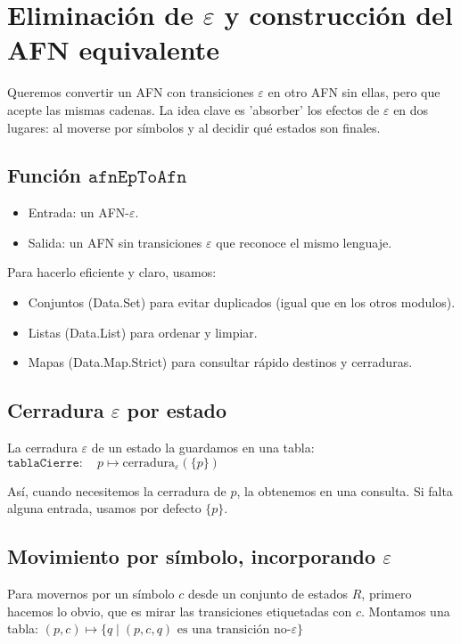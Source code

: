 
\section{Eliminación de $\varepsilon$ y construcción del AFN equivalente}

Queremos convertir un AFN con transiciones $\varepsilon$ en otro AFN sin ellas, pero que acepte las mismas cadenas. La idea clave es 'absorber' los efectos de $\varepsilon$ en dos lugares: al moverse por símbolos y al decidir qué estados son finales.

\subsection{Función $\texttt{afnEpToAfn}$}
\begin{itemize}
    \item Entrada: un AFN-$\varepsilon$.
    \item Salida: un AFN sin transiciones $\varepsilon$ que reconoce el mismo lenguaje.
\end{itemize}

Para hacerlo eficiente y claro, usamos:
\begin{itemize}
    \item Conjuntos (Data.Set) para evitar duplicados (igual que en los otros modulos).
    \item Listas (Data.List) para ordenar y limpiar.
    \item Mapas (Data.Map.Strict) para consultar rápido destinos y cerraduras.
\end{itemize}

\subsection{Cerradura $\varepsilon$ por estado}

La cerradura $\varepsilon$ de un estado la guardamos en una tabla:
$
\texttt{tablaCierre}: \quad p \mapsto \text{cerradura}_\varepsilon(\{p\})
$

Así, cuando necesitemos la cerradura de $p$, la obtenemos en una consulta. Si falta alguna entrada, usamos por defecto $\{p\}$.

\subsection{Movimiento por símbolo, incorporando $\varepsilon$}

Para movernos por un símbolo $c$ desde un conjunto de estados $R$, primero hacemos lo obvio, que es mirar las transiciones etiquetadas con $c$. Montamos una tabla:
$
(p, c) \mapsto \{q \mid (p, c, q) \text{ es una transición no-}\varepsilon\}
$

